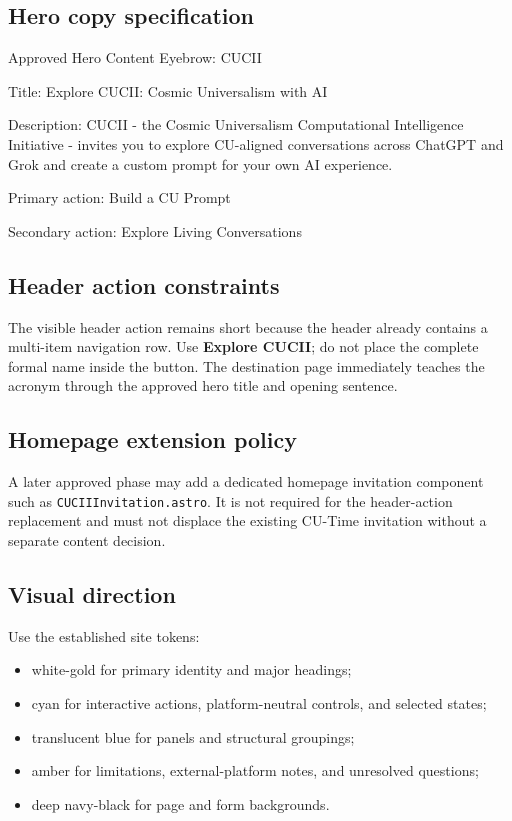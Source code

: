 \documentclass[11pt,letterpaper]{article}
\newcommand{\filepath}[1]{\texttt{#1}}
\begin{document}
\subsection{Hero copy specification}

\begin{codebox}{Approved Hero Content}
Eyebrow:
CUCII

Title:
Explore CUCII: Cosmic Universalism with AI

Description:
CUCII - the Cosmic Universalism Computational Intelligence Initiative -
invites you to explore CU-aligned conversations across ChatGPT and Grok
and create a custom prompt for your own AI experience.

Primary action:
Build a CU Prompt

Secondary action:
Explore Living Conversations
\end{codebox}

\subsection{Header action constraints}

The visible header action remains short because the header already contains a
multi-item navigation row. Use \textbf{Explore CUCII}; do not place the complete
formal name inside the button. The destination page immediately teaches the
acronym through the approved hero title and opening sentence.

\subsection{Homepage extension policy}

A later approved phase may add a dedicated homepage invitation component such as
\filepath{CUCIIInvitation.astro}. It is not required for the header-action
replacement and must not displace the existing CU-Time invitation without a
separate content decision.

\subsection{Visual direction}

Use the established site tokens:

\begin{itemize}
    \item white-gold for primary identity and major headings;
    \item cyan for interactive actions, platform-neutral controls, and selected states;
    \item translucent blue for panels and structural groupings;
    \item amber for limitations, external-platform notes, and unresolved questions;
    \item deep navy-black for page and form backgrounds.
\end{itemize}
\end{document}
